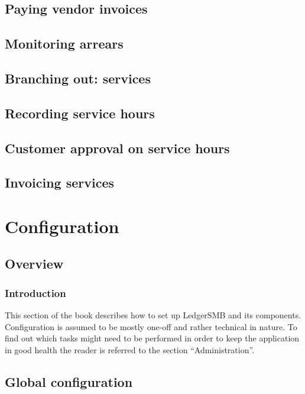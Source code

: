 \documentclass[10pt,A4]{book}
\begin{document}
\chapter{Paying vendor invoices}

\chapter{Monitoring arrears}

\chapter{Branching out: services}

\chapter{Recording service hours}

\chapter{Customer approval on service hours}

\chapter{Invoicing services}




\part{Configuration}
\label{part:Configuration}


\chapter{Overview}

\section{Introduction}
This section of the book describes how to set up LedgerSMB and its components.
Configuration is assumed to be mostly one-off and rather technical in nature.  To find
out which tasks might need to be performed in order to keep the application in good
health the reader is referred to the section ``Administration''. 

\chapter{Global configuration}
\end{document}
